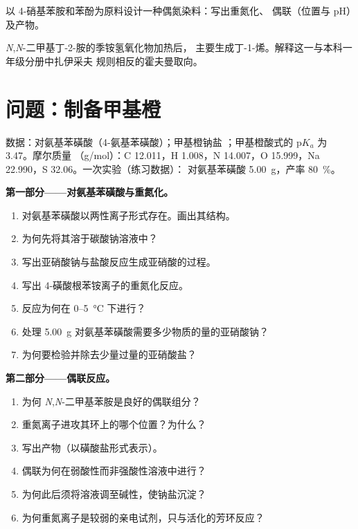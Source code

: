 \begin{exercise}[$\star\star\star$]\label{exo:b2:amines:11}
以 4-硝基苯胺和苯酚为原料设计一种偶氮染料：写出重氮化、
偶联（位置与 pH）及产物。
\end{exercise}

\begin{exercise}[$\star\star\star$]\label{exo:b2:amines:12}
\textit{N},\textit{N}-二甲基丁-2-胺的季铵氢氧化物加热后，
主要生成丁-1-烯。解释这一与本科一年级分册中扎伊采夫
规则相反的霍夫曼取向。
\end{exercise}

\section{问题：制备甲基橙}

\begin{problem}
\label{pb:b2:amines:1}
数据：对氨基苯磺酸（4-氨基苯磺酸）；甲基橙钠盐
；甲基橙酸式的 $\mathrm pK_a$ 为 3.47。摩尔质量
（\unit{g/mol}）：C 12.011，H 1.008，N 14.007，O 15.999，Na 22.990，S 32.06。一次实验（练习数据）：
对氨基苯磺酸 \qty{5.00}{g}，产率 80~\%。

\medskip
\noindent\textbf{第一部分——对氨基苯磺酸与重氮化。}
\begin{enumerate}
  \item 对氨基苯磺酸以两性离子形式存在。画出其结构。
  \item 为何先将其溶于碳酸钠溶液中？
  \item 写出亚硝酸钠与盐酸反应生成亚硝酸的过程。
  \item 写出 4-磺酸根苯铵离子的重氮化反应。
  \item 反应为何在 0--\qty{5}{\degreeCelsius} 下进行？
  \item 处理 \qty{5.00}{g} 对氨基苯磺酸需要多少物质的量的亚硝酸钠？
  \item 为何要检验并除去少量过量的亚硝酸盐？
\end{enumerate}

\medskip
\noindent\textbf{第二部分——偶联反应。}
\begin{enumerate}[resume]
  \item 为何 \textit{N},\textit{N}-二甲基苯胺是良好的偶联组分？
  \item 重氮离子进攻其环上的哪个位置？为什么？
  \item 写出产物（以磺酸盐形式表示）。
  \item 偶联为何在弱酸性而非强酸性溶液中进行？
  \item 为何此后须将溶液调至碱性，使钠盐沉淀？
  \item 为何重氮离子是较弱的亲电试剂，只与活化的芳环反应？
\end{enumerate}


\end{problem}
